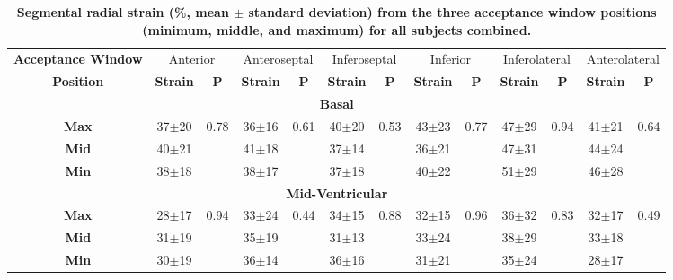 	\begin{landscape}
	\begin{table}
		\centering
		\caption[Segmental radial strain (\%, mean $\pm$ standard deviation) from the three acceptance window positions (minimum, middle, and maximum) for all subjects combined]{\textbf{Segmental radial strain (\%, mean $\pm$ standard deviation) from the three acceptance window positions (minimum, middle, and maximum) for all subjects combined.}}
		\label{table:SegmentalErrStrainDiff}
		\begin{tabular}{ccccccccccccc}
			\toprule
			\multicolumn{1}{c}{\textbf{Acceptance Window}} & \multicolumn{2}{c}{Anterior} & \multicolumn{2}{c}{Anteroseptal} & \multicolumn{2}{c}{Inferoseptal} &
			\multicolumn{2}{c}{Inferior} & \multicolumn{2}{c}{Inferolateral} & \multicolumn{2}{c}{Anterolateral}\\
			\multicolumn{1}{c}{\textbf{Position}}& \textbf{Strain} & \textbf{P} & \textbf{Strain} & \textbf{P} & \textbf{Strain} & \textbf{P} &
			\textbf{Strain} & \textbf{P} & \textbf{Strain} & \textbf{P} & \textbf{Strain} & \textbf{P} \\
			\midrule
			
			\multicolumn{13}{c}{\textbf{Basal}} \\
			\midrule
			\textbf{Max} & 37$\pm$20 & \multirow{3}{*}{0.78} & 36$\pm$16 & \multirow{3}{*}{0.61} & 40$\pm$20 & \multirow{3}{*}{0.53}
			& 43$\pm$23 & \multirow{3}{*}{0.77} & 47$\pm$29 & \multirow{3}{*}{0.94} & 41$\pm$21 & \multirow{3}{*}{0.64} \\
			\textbf{Mid} & 40$\pm$21 &                       & 41$\pm$18 &                       & 37$\pm$14 & 
			& 36$\pm$21 &                       & 47$\pm$31 &                       & 44$\pm$24 &                       \\
			\textbf{Min} & 38$\pm$18 &                       & 38$\pm$17 &                       & 37$\pm$18 & 
			& 40$\pm$22 &                       & 51$\pm$29 &                       & 46$\pm$28 &  \\ 
			\midrule
			
			\multicolumn{13}{c}{\textbf{Mid-Ventricular}} \\
			\midrule
			\textbf{Max} & 28$\pm$17 & \multirow{3}{*}{0.94} & 33$\pm$24 & \multirow{3}{*}{0.44} & 34$\pm$15 & \multirow{3}{*}{0.88}
			& 32$\pm$15 & \multirow{3}{*}{0.96} & 36$\pm$32 & \multirow{3}{*}{0.83} & 32$\pm$17 & \multirow{3}{*}{0.49} \\
			\textbf{Mid} & 31$\pm$19 &                       & 35$\pm$19 &                       & 31$\pm$13 & 
			& 33$\pm$24 &                       & 38$\pm$29 &                       & 33$\pm$18 &                       \\
			\textbf{Min} & 30$\pm$19 &                       & 36$\pm$14 &                       & 36$\pm$16 & 
			& 31$\pm$21 &                       & 35$\pm$24 &                       & 28$\pm$17 &  \\ 
			\midrule
			

\end{tabular}
\end{table}
\end{landscape}
